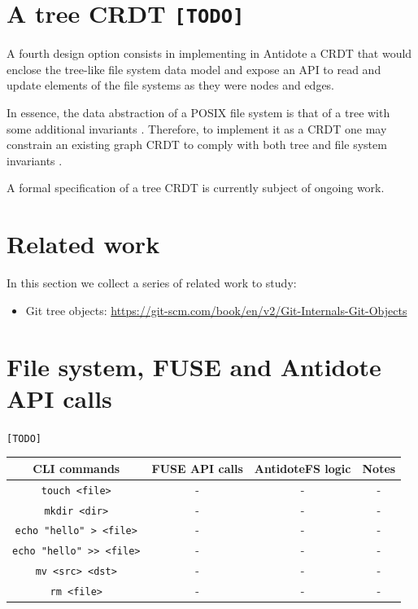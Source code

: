 \documentclass[11pt]{article}
\newcommand{\status}[1]{{\texttt{\footnotesize [#1]}}}
\begin{document}
\section{A tree CRDT \status{TODO}}
\label{sec:design4}
A fourth design option consists in implementing in Antidote a CRDT that would 
enclose the tree-like file system data model and expose an API to
read and update elements of the file systems as they were nodes and edges.

In essence, the data abstraction of a POSIX file system is that of a tree with some additional 
invariants \cite{fs-mahsa}.
Therefore, to implement it as a CRDT one may constrain an existing graph CRDT \cite{crdts-sss}
to comply with both tree and file system invariants \cite{martin:hal-00648106}.

A formal specification of a tree CRDT is currently subject of ongoing work.





\appendix

\clearpage
\section{Related work}
In this section we collect a series of related work to study:
\begin{itemize}
\item Git tree objects: \url{https://git-scm.com/book/en/v2/Git-Internals-Git-Objects}
\end{itemize}


\clearpage
\section{File system, FUSE and Antidote API calls}

\status{TODO}

\begin{center}
\begin{tabular}{c|c|c|c}
	\hline
	CLI commands & FUSE API calls & AntidoteFS logic & Notes \\
	\hline
	\texttt{touch <file>} & - & - & - \\
	\texttt{mkdir <dir>} & - & - & - \\
	\texttt{echo "hello" > <file>} & - & - & - \\
	\texttt{echo "hello" >> <file>} & - & - & - \\
	\texttt{mv <src> <dst>} & - & - & - \\
	\texttt{rm <file>} & - & - & - \\
	
\end{tabular}
\end{center}
\end{document}
